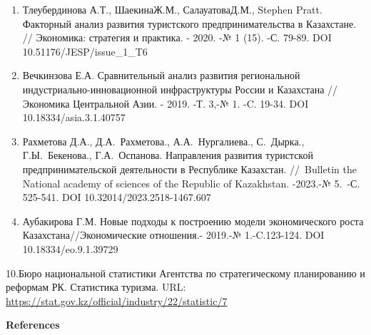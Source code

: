 \begin{references}
\begin{enumerate}
\def\labelenumi{\arabic{enumi}.}
\setcounter{enumi}{5}
\item
  Тлеубердинова А.Т., ШаекинаЖ.М., СалауатоваД.М., Stephen Pratt.
  Факторный анализ развития туристского предпринимательства в
  Казахстане. // Экономика: стратегия и практика. - 2020. -№ 1 (15). -С.
  79-89. DOI 10.51176/JESP/issue\_1\_T6
\item
  Вечкинзова Е.А. Сравнительный анализ развития региональной
  индустриально-инновационной инфраструктуры России и Казахстана //
  Экономика Центральной Азии. - 2019. -Т. 3,-№ 1. -C. 19-34. DOI
  10.18334/asia.3.1.40757
\item
  Рахметова Д.А., Д.А.~Рахметова., А.А.~Нургалиева., С.~Дырка.,
  Г.Ы.~Бекенова., Г.А.~Оспанова. Направления развития туристской
  предпринимательской деятельности в Республике Казахстан. //~Bulletin
  the National academy of sciences of the Republic of Kazakhstan.
  -2023.-№ 5.~-С. 525-541. DOI 10.32014/2023.2518-1467.607
\item
  Аубакирова Г.М. Новые подходы к построению модели экономического роста
  Казахстана//Экономические отношения.- 2019.-№ 1.-C.123-124. DOI
  10.18334/eo.9.1.39729
\end{enumerate}

10.Бюро национальной статистики Агентства по стратегическому
планированию и реформам РК. Статистика туризма. URL:
\url{https://stat.gov.kz/official/industry/22/statistic/7}

\end{references}

\begin{center}
{\bfseries References}
\end{center}


